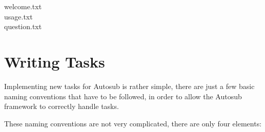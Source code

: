 \begin{description}
\item [welcome.txt]
\item [usage.txt]
\item [question.txt]  
\end{description}



\cleardoublepage
\section{Writing Tasks}\label{sec:writingtasks}

Implementing new tasks for Autosub is rather simple, there are just a few basic
naming conventions that have to be followed, in order to allow the Autosub
framework to correctly handle tasks.

These naming conventions are not very complicated, there are only four elements:


